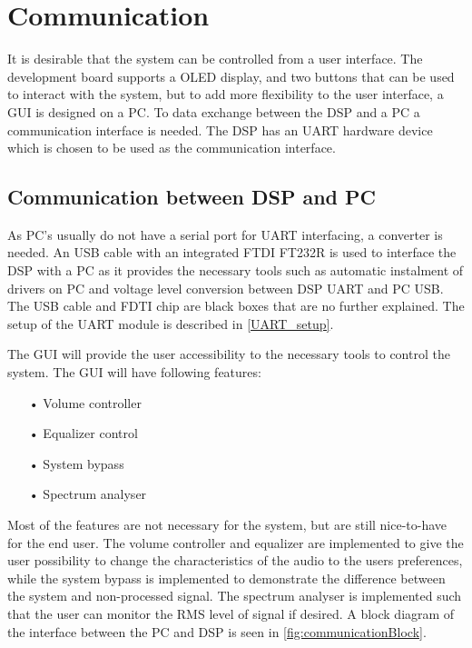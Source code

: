 \chapter{Communication}

It is desirable that the system can be controlled from a user interface. The development board supports a OLED display, and two buttons that can be used to interact with the system, but to add more flexibility to the user interface, a GUI is designed on a PC. To data exchange between the DSP and a PC a communication interface is needed. The DSP has an UART hardware device which is chosen to be used as the communication interface. 

\section{Communication between DSP and PC}

As PC's usually do not have a serial port for UART interfacing, a converter is needed. An USB cable with an integrated FTDI FT232R is used to interface the DSP with a PC as it provides the necessary tools such as automatic instalment of drivers on PC and voltage level conversion between DSP UART and PC USB. The USB cable and FDTI chip are black boxes that are no further explained. The setup of the UART module is described in \autoref{UART_setup}.

The GUI will provide the user accessibility to the necessary tools to control the system. The GUI will have following features:
\begin{itemize}
\item[•]Volume controller
\item[•]Equalizer control
\item[•]System bypass
\item[•]Spectrum analyser
\end{itemize} 

Most of the features are not necessary for the system, but are still nice-to-have for the end user. The volume controller and equalizer are implemented to give the user possibility to change the characteristics of the audio to the users preferences, while the system bypass is implemented to demonstrate the difference between the system and non-processed signal. The spectrum analyser is implemented such that the user can monitor the RMS level of signal if desired. A block diagram of the interface between the PC and DSP is seen in \autoref{fig:communicationBlock}.

